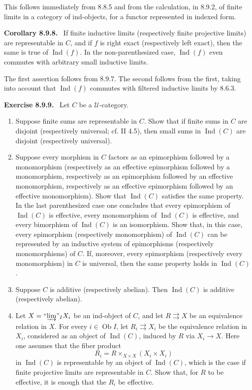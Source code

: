 \documentclass[11pt]{article}
\newcommand{\U}{\mathcal{U}}
\newcommand{\Ob}{\operatorname{Ob}}
\newcommand{\Ind}{\operatorname{Ind}}
\newcommand{\indlim}{\textrm{``}\!\varinjlim\!\textrm{''}}
\newenvironment{statement}[1]{\par\medskip\noindent\textbf{#1.}\ }{\par\medskip}
\begin{document}
This follows immediately from 8.8.5 and from the calculation, in 8.9.2, of finite limits in a category of ind-objects, for a functor represented in indexed form.

\begin{statement}{Corollary 8.9.8}
If finite inductive limits (respectively finite projective limits) are representable in $C$, and if $f$ is right exact (respectively left exact), then the same is true of $\Ind(f)$. In the non-parenthesized case, $\Ind(f)$ even commutes with arbitrary small inductive limits.
\end{statement}

The first assertion follows from 8.9.7. The second follows from the first, taking into account that $\Ind(f)$ commutes with filtered inductive limits by 8.6.3.

\begin{statement}{Exercise 8.9.9}
Let $C$ be a $\U$-category.
\begin{enumerate}[label=\alph*)]
\item Suppose finite sums are representable in $C$. Show that if finite sums in $C$ are disjoint (respectively universal; cf. II 4.5), then small sums in $\Ind(C)$ are disjoint (respectively universal).

\item Suppose every morphism in $C$ factors as an epimorphism followed by a monomorphism (respectively as an effective epimorphism followed by a monomorphism, respectively as an epimorphism followed by an effective monomorphism, respectively as an effective epimorphism followed by an effective monomorphism). Show that $\Ind(C)$ satisfies the same property. In the last parenthesized case one concludes that every epimorphism of $\Ind(C)$ is effective, every monomorphism of $\Ind(C)$ is effective, and every bimorphism of $\Ind(C)$ is an isomorphism. Show that, in this case, every epimorphism (respectively monomorphism) of $\Ind(C)$ can be represented by an inductive system of epimorphisms (respectively monomorphisms) of $C$. If, moreover, every epimorphism (respectively every monomorphism) in $C$ is universal, then the same property holds in $\Ind(C)$.

\item Suppose $C$ is additive (respectively abelian). Then $\Ind(C)$ is additive (respectively abelian).

\item Let $X=\indlim_I X_i$ be an ind-object of $C$, and let $R\rightrightarrows X$ be an equivalence relation in $X$. For every $i\in\Ob I$, let $R_i\rightrightarrows X_i$ be the equivalence relation in $X_i$, considered as an object of $\Ind(C)$, induced by $R$ via $X_i\to X$. Here one assumes that the fiber product
\[
 R_i=R\times_{X\times X}(X_i\times X_i)
\]
in $\Ind(C)$ is representable by an object of $\Ind(C)$, which is the case if finite projective limits are representable in $C$. Show that, for $R$ to be effective, it is enough that the $R_i$ be effective.


\end{enumerate}
\end{statement}
\end{document}
